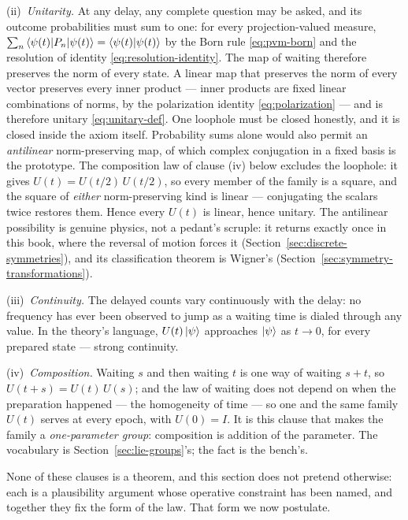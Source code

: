 (ii)~\emph{Unitarity.} At any delay, any complete question may be asked, and its outcome probabilities must sum to one: for every projection-valued measure, $\sum_n \braket{\psi(t)|P_n|\psi(t)} = \braket{\psi(t)|\psi(t)}$ by the Born rule \eqref{eq:pvm-born} and the resolution of identity \eqref{eq:resolution-identity}. The map of waiting therefore preserves the norm of every state. A linear map that preserves the norm of every vector preserves every inner product --- inner products are fixed linear combinations of norms, by the polarization identity \eqref{eq:polarization} --- and is therefore unitary \eqref{eq:unitary-def}. One loophole must be closed honestly, and it is closed inside the axiom itself. Probability sums alone would also permit an \emph{antilinear} norm-preserving map, of which complex conjugation in a fixed basis is the prototype. The composition law of clause (iv) below excludes the loophole: it gives $U(t) = U(t/2)\,U(t/2)$, so every member of the family is a square, and the square of \emph{either} norm-preserving kind is linear --- conjugating the scalars twice restores them. Hence every $U(t)$ is linear, hence unitary. The antilinear possibility is genuine physics, not a pedant's scruple: it returns exactly once in this book, where the reversal of motion forces it (Section~\ref{sec:discrete-symmetries}), and its classification theorem is Wigner's (Section~\ref{sec:symmetry-transformations}).

(iii)~\emph{Continuity.} The delayed counts vary continuously with the delay: no frequency has ever been observed to jump as a waiting time is dialed through any value. In the theory's language, $U(t)\ket{\psi}$ approaches $\ket{\psi}$ as $t \to 0$, for every prepared state --- strong continuity.

(iv)~\emph{Composition.} Waiting $s$ and then waiting $t$ is one way of waiting $s + t$, so $U(t+s) = U(t)\,U(s)$; and the law of waiting does not depend on when the preparation happened --- the homogeneity of time --- so one and the same family $U(t)$ serves at every epoch, with $U(0) = I$. It is this clause that makes the family a \emph{one-parameter group}: composition is addition of the parameter. The vocabulary is Section~\ref{sec:lie-groups}'s; the fact is the bench's.

None of these clauses is a theorem, and this section does not pretend otherwise: each is a plausibility argument whose operative constraint has been named, and together they fix the form of the law. That form we now postulate.

